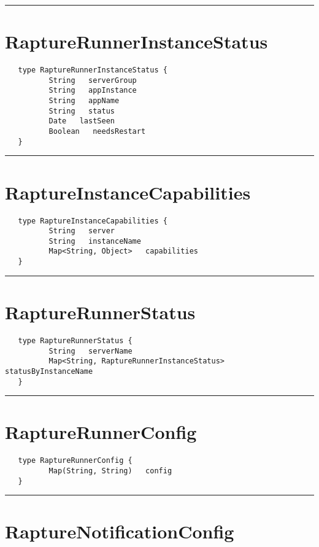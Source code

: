\rule{12cm}{2pt}
\section{RaptureRunnerInstanceStatus}
\label{type:RaptureRunnerInstanceStatus}

\begin{Verbatim}
   type RaptureRunnerInstanceStatus {
          String   serverGroup
          String   appInstance
          String   appName
          String   status
          Date   lastSeen
          Boolean   needsRestart
   }
\end{Verbatim}

\rule{12cm}{2pt}
\section{RaptureInstanceCapabilities}
\label{type:RaptureInstanceCapabilities}

\begin{Verbatim}
   type RaptureInstanceCapabilities {
          String   server
          String   instanceName
          Map<String, Object>   capabilities
   }
\end{Verbatim}

\rule{12cm}{2pt}
\section{RaptureRunnerStatus}
\label{type:RaptureRunnerStatus}

\begin{Verbatim}
   type RaptureRunnerStatus {
          String   serverName
          Map<String, RaptureRunnerInstanceStatus>   statusByInstanceName
   }
\end{Verbatim}

\rule{12cm}{2pt}
\section{RaptureRunnerConfig}
\label{type:RaptureRunnerConfig}

\begin{Verbatim}
   type RaptureRunnerConfig {
          Map(String, String)   config
   }
\end{Verbatim}

\rule{12cm}{2pt}
\section{RaptureNotificationConfig}
\label{type:RaptureNotificationConfig}

